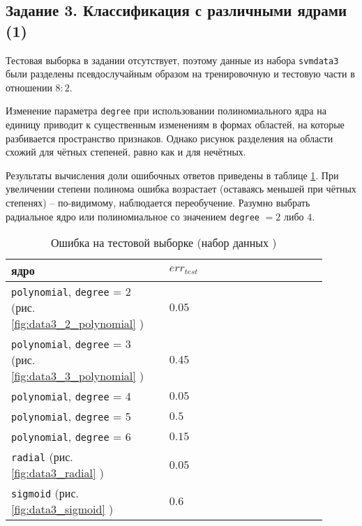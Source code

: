 \documentclass[a4paper,12pt]{article} %
\begin{document}
\subsection{Задание 3. Классификация с различными ядрами (1)}\label{section:task3}

Тестовая выборка в задании  отсутствует, поэтому данные из набора \texttt{svmdata3} были разделены псевдослучайным образом на тренировочную и тестовую части в отношении $ 8:2 $.

Изменение параметра \texttt{degree} при использовании полиномиального ядра на единицу приводит к существенным изменениям в формах областей, на которые разбивается пространство признаков.
Однако рисунок разделения на области схожий для чётных степеней, равно как и для нечётных.

Результаты вычисления доли ошибочных ответов приведены в таблице \ref{table:3}.
При увеличении степени полинома ошибка возрастает (оставаясь меньшей при чётных степенях) -- по-видимому, наблюдается переобучение.
Разумно выбрать радиальное ядро или полиномиальное со значением \texttt{degree} $ =2 $ либо $ 4 $.

\begin{table}[H]
    \caption{Ошибка на тестовой выборке (набор данных )}
    \begin{tabular}{m{0.45\linewidth} | m{0.45\linewidth}}
        \hline \hline
        ядро & $err_{test}$ \\
        \hline
        \texttt{polynomial}, \texttt{degree} = 2 (рис. \ref{fig:data3_2_polynomial} ) & $ 0.05 $ \\
        \texttt{polynomial}, \texttt{degree} = 3 (рис. \ref{fig:data3_3_polynomial} ) & $ 0.45 $ \\
        \texttt{polynomial}, \texttt{degree} = 4  & $ 0.05 $ \\
        \texttt{polynomial}, \texttt{degree} = 5  & $ 0.5 $ \\
        \texttt{polynomial}, \texttt{degree} = 6  & $ 0.15 $ \\
        \texttt{radial} (рис. \ref{fig:data3_radial} ) & $ 0.05 $ \\
        \texttt{sigmoid} (рис. \ref{fig:data3_sigmoid} ) & $ 0.6 $ \\
        \hline
    \end{tabular}
    \label{table:3}
\end{table}
\end{document}
